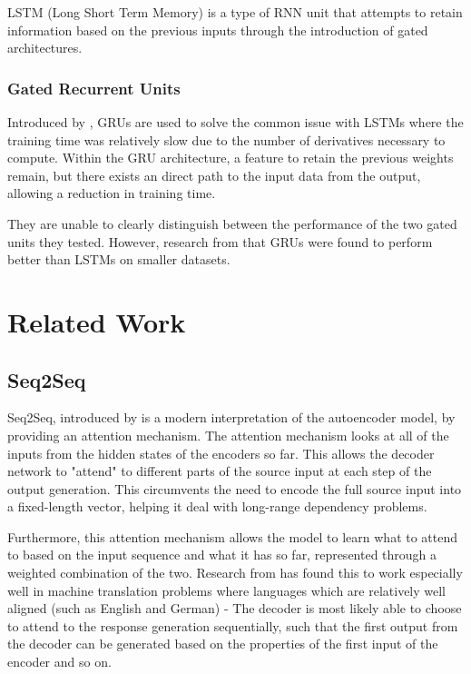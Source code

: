 \documentclass[12pt,twoside]{report}
\begin{document}
LSTM (Long Short Term Memory) is a type of RNN unit that attempts to retain information based on the previous inputs through the introduction of gated architectures.

\subsubsection{Gated Recurrent Units}

Introduced by \cite{cho_properties_2014}, GRUs are used to solve the common issue with LSTMs where the training time was relatively slow due to the number of derivatives necessary to compute. Within the GRU architecture, a feature to retain the previous weights remain, but there exists an direct path to the input data from the output, allowing a reduction in training time. 

They are unable to clearly distinguish between the performance of the two gated units they tested.
However, research from \cite{chung_empirical_2014} that GRUs were found to perform better than LSTMs on smaller datasets. 

\section{Related Work}

\subsection{Seq2Seq}

Seq2Seq, introduced by \cite{sutskever_sequence_2014} is a modern interpretation of the autoencoder model, by providing an attention mechanism. The attention mechanism looks at all of the inputs from the hidden states of the encoders so far. This allows the decoder network to "attend" to different parts of the source input at each step of the output generation. This circumvents the need to encode the full source input into a fixed-length vector, helping it deal with long-range dependency problems.

Furthermore, this attention mechanism allows the model to learn what to attend to based on the input sequence and what it has so far, represented through a weighted combination of the two. Research from \cite{bahdanau_neural_2014} has found this to work especially well in machine translation problems where languages which are relatively well aligned (such as English and German) - The decoder is most likely able to choose to attend to the response generation sequentially, such that the first output from the decoder can be generated based on the properties of the first input of the encoder and so on.
\end{document}
